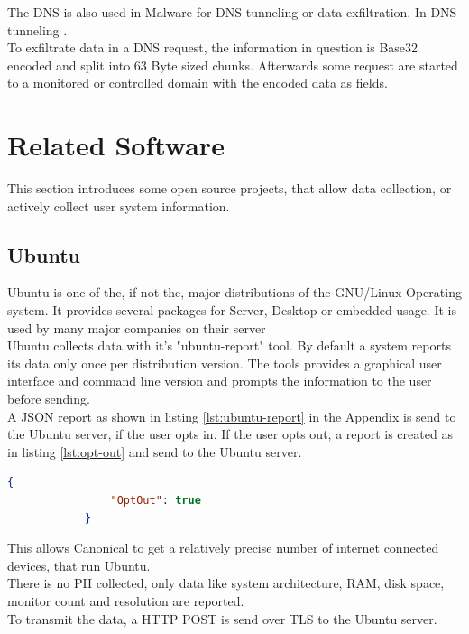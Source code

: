         
        The DNS is also used in Malware for DNS-tunneling or data exfiltration.
        In DNS tunneling \cite{das_detection_2017}.\\
        To exfiltrate data in a DNS request, the information in question is Base32 encoded and split into 63 Byte sized chunks. Afterwards some request are started to a monitored or controlled domain with the encoded data as fields\cite{mertens_infosec_2017}.\\
        

\section{Related Software}
    \label{sec:related:related_sw}
    This section introduces some open source projects, that allow data collection, or actively collect user system information. 
    
    \subsection{Ubuntu}
        Ubuntu is one of the, if not the, major distributions of the GNU/Linux Operating system. It provides several packages for Server, Desktop or embedded usage. It is used by many major companies on their server\cite{canonical_enterprise_nodate}\\
        Ubuntu collects data with it's "ubuntu-report" tool. By default a system reports its data only once per distribution version. The tools provides a graphical user interface and command line version and prompts the information to the user before sending\cite{roche_ubuntuubuntu-report_2020}.\\
        A JSON report as shown in listing \ref{lst:ubuntu-report} in the Appendix is send to the Ubuntu server, if the user opts in. If the user opts out, a report is created as in listing \ref{lst:opt-out} and send to the Ubuntu server\cite{roche_ubuntuubuntu-report_2020}.\\ 
        \begin{lstlisting}[language=json, caption=JSON report on opt out, label=lst:opt-out]
            {
                "OptOut": true
            }
        \end{lstlisting}
        This allows Canonical to get a relatively precise number of internet connected devices, that run Ubuntu.\\
        There is no PII collected, only data like system architecture, RAM, disk space, monitor count and resolution are reported.\\
        To transmit the data, a HTTP POST is send over TLS to the Ubuntu server.\\
        
